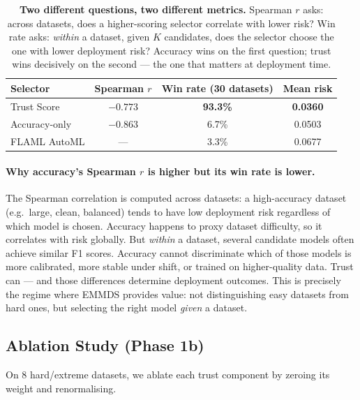 \documentclass[10pt]{article}
\begin{document}
\begin{table}[h]
\centering
\caption{%
  \textbf{Two different questions, two different metrics.}
  Spearman $r$ asks: across datasets, does a higher-scoring selector correlate with lower risk?
  Win rate asks: \emph{within} a dataset, given $K$ candidates, does the selector choose the one with lower deployment risk?
  Accuracy wins on the first question; trust wins decisively on the second — the one that matters at deployment time.
}
\label{tab:spearman}
\begin{tabular}{lccc}
\toprule
\textbf{Selector} & \textbf{Spearman $r$} & \textbf{Win rate (30 datasets)} & \textbf{Mean risk} \\
\midrule
Trust Score   & $-0.773$ & \textbf{93.3\%} & \textbf{0.0360} \\
Accuracy-only & $-0.863$ & 6.7\%  & 0.0503 \\
FLAML AutoML  & ---      & 3.3\%  & 0.0677 \\
\bottomrule
\end{tabular}
\end{table}

\paragraph{Why accuracy's Spearman $r$ is higher but its win rate is lower.}
The Spearman correlation is computed across datasets: a high-accuracy dataset (e.g.\ large, clean, balanced) tends to have low deployment risk regardless of which model is chosen. Accuracy happens to proxy dataset difficulty, so it correlates with risk globally. But \emph{within} a dataset, several candidate models often achieve similar F1 scores. Accuracy cannot discriminate which of those models is more calibrated, more stable under shift, or trained on higher-quality data. Trust can — and those differences determine deployment outcomes. This is precisely the regime where EMMDS provides value: not distinguishing easy datasets from hard ones, but selecting the right model \emph{given} a dataset.

\subsection{Ablation Study (Phase 1b)}

On 8 hard/extreme datasets, we ablate each trust component by zeroing its weight and renormalising.
\end{document}
